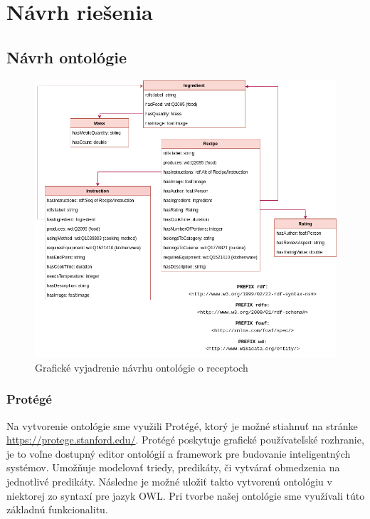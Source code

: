 \chapter{Návrh riešenia}
\label{kap:navrh} %


\section{Návrh ontológie}

\begin{figure}[h]
\includegraphics[width=\textwidth]{images/ontology}
\caption{Grafické vyjadrenie návrhu ontológie o receptoch}
\label{ontology}
\end{figure}

\subsection{Protégé}
Na vytvorenie ontológie sme využili Protégé, ktorý je možné stiahnuť na stránke \href{https://protege.stanford.edu/}{https://protege.stanford.edu/}. Protégé poskytuje grafické používateľské rozhranie, je to voľne dostupný editor ontológií a framework pre budovanie inteligentných systémov. Umožňuje modelovať triedy, predikáty, či vytvárať obmedzenia na jednotlivé predikáty. Následne je možné uložiť takto vytvorenú ontológiu v niektorej zo syntaxí pre jazyk OWL. Pri tvorbe našej ontológie sme využívali túto základnú funkcionalitu.

